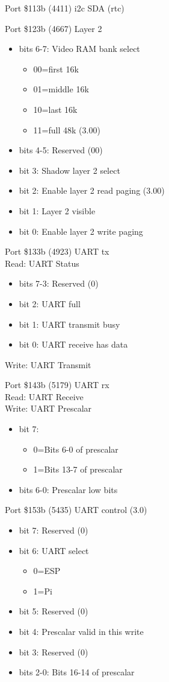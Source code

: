 Port \$113b (4411) i2c SDA (rtc)

Port \$123b (4667) Layer 2
\begin{itemize}
\item[] bits 6-7: Video RAM bank select
  \begin{itemize}
  \item[] 00=first 16k
  \item[] 01=middle 16k
  \item[] 10=last 16k
  \item[] 11=full 48k (3.00)
  \end{itemize}
\item[] bits 4-5: Reserved (00)
\item[] bit 3: Shadow layer 2 select
\item[] bit 2: Enable layer 2 read paging (3.00)
\item[] bit 1: Layer 2 visible
\item[] bit 0: Enable layer 2 write paging
\end{itemize}

Port \$133b (4923) UART tx\\
Read: UART Status\\
\begin{itemize}
\item[] bits 7-3: Reserved (0)
\item[] bit 2: UART full
\item[] bit 1: UART transmit busy
\item[] bit 0: UART receive has data
\end{itemize}
Write: UART Transmit

Port \$143b (5179) UART rx\\
Read: UART Receive\\
Write: UART Prescalar
\begin{itemize}
\item[] bit 7:
  \begin{itemize}
  \item[] 0=Bits 6-0 of prescalar
  \item[] 1=Bits 13-7 of prescalar
  \end{itemize}
\item[] bits 6-0: Prescalar low bits
\end{itemize}

Port \$153b (5435) UART control (3.0)
\begin{itemize}
\item[] bit 7: Reserved (0)
\item[] bit 6: UART select
  \begin{itemize}
  \item[] 0=ESP
  \item[] 1=Pi
  \end{itemize}
\item[] bit 5: Reserved (0)
\item[] bit 4: Prescalar valid in this write
\item[] bit 3: Reserved (0)
\item[] bits 2-0: Bits 16-14 of prescalar
\end{itemize}

